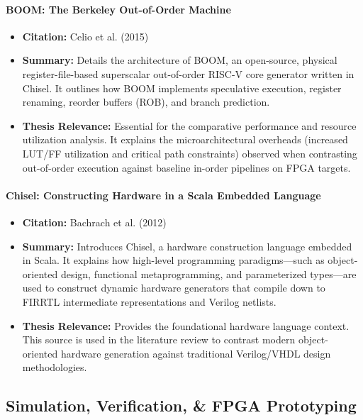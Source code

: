 \documentclass[12pt,a4paper]{article}
\begin{document}
\paragraph{BOOM: The Berkeley Out-of-Order Machine}
\begin{itemize}
    \item \textbf{Citation:} Celio et al. (2015) \cite{celio2015boom}
    \item \textbf{Summary:} Details the architecture of BOOM, an open-source, physical register-file-based superscalar out-of-order RISC-V core generator written in Chisel. It outlines how BOOM implements speculative execution, register renaming, reorder buffers (ROB), and branch prediction.
    \item \textbf{Thesis Relevance:} Essential for the comparative performance and resource utilization analysis. It explains the microarchitectural overheads (increased LUT/FF utilization and critical path constraints) observed when contrasting out-of-order execution against baseline in-order pipelines on FPGA targets.
\end{itemize}

\paragraph{Chisel: Constructing Hardware in a Scala Embedded Language}
\begin{itemize}
    \item \textbf{Citation:} Bachrach et al. (2012) \cite{bachrach2012chisel}
    \item \textbf{Summary:} Introduces Chisel, a hardware construction language embedded in Scala. It explains how high-level programming paradigms—such as object-oriented design, functional metaprogramming, and parameterized types—are used to construct dynamic hardware generators that compile down to FIRRTL intermediate representations and Verilog netlists.
    \item \textbf{Thesis Relevance:} Provides the foundational hardware language context. This source is used in the literature review to contrast modern object-oriented hardware generation against traditional Verilog/VHDL design methodologies.
\end{itemize}

\subsection{Simulation, Verification, \& FPGA Prototyping}
\end{document}

